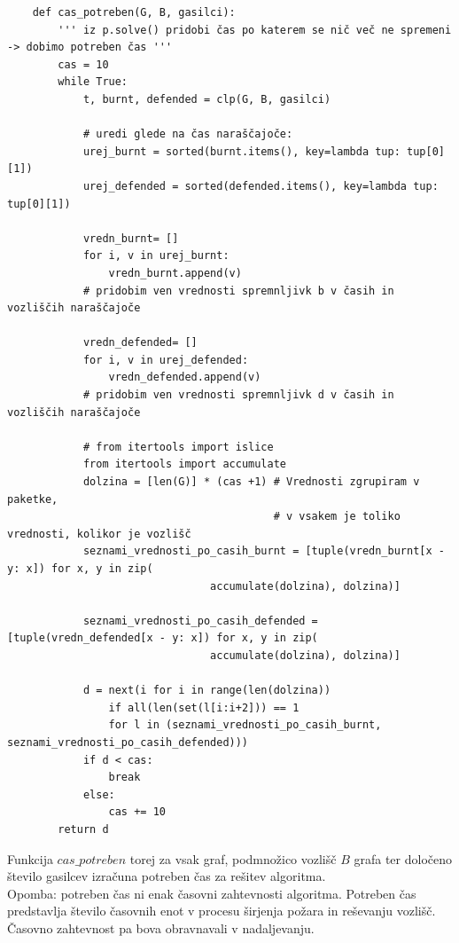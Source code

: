 \documentclass[a4paper, 12pt]{article}
\begin{document}
\begin{scriptsize}
\begin{verbatim}
    def cas_potreben(G, B, gasilci):
        ''' iz p.solve() pridobi čas po katerem se nič več ne spremeni -> dobimo potreben čas '''
        cas = 10
        while True:
            t, burnt, defended = clp(G, B, gasilci)

            # uredi glede na čas naraščajoče:
            urej_burnt = sorted(burnt.items(), key=lambda tup: tup[0][1])
            urej_defended = sorted(defended.items(), key=lambda tup: tup[0][1]) 

            vredn_burnt= []
            for i, v in urej_burnt:
                vredn_burnt.append(v)
            # pridobim ven vrednosti spremnljivk b v časih in vozliščih naraščajoče

            vredn_defended= []
            for i, v in urej_defended:
                vredn_defended.append(v)
            # pridobim ven vrednosti spremnljivk d v časih in vozliščih naraščajoče

            # from itertools import islice
            from itertools import accumulate
            dolzina = [len(G)] * (cas +1) # Vrednosti zgrupiram v paketke, 
                                          # v vsakem je toliko vrednosti, kolikor je vozlišč
            seznami_vrednosti_po_casih_burnt = [tuple(vredn_burnt[x - y: x]) for x, y in zip(
                                accumulate(dolzina), dolzina)]

            seznami_vrednosti_po_casih_defended = [tuple(vredn_defended[x - y: x]) for x, y in zip(
                                accumulate(dolzina), dolzina)]

            d = next(i for i in range(len(dolzina)) 
                if all(len(set(l[i:i+2])) == 1 
                for l in (seznami_vrednosti_po_casih_burnt, seznami_vrednosti_po_casih_defended)))
            if d < cas:
                break
            else:
                cas += 10
        return d\end{verbatim}
\end{scriptsize}

\noindent Funkcija $cas\_potreben$ torej za vsak graf, podmnožico vozlišč $B$ grafa ter določeno število gasilcev
izračuna potreben čas za rešitev algoritma. \\
Opomba: potreben čas ni enak časovni zahtevnosti
algoritma. Potreben čas predstavlja število časovnih enot v procesu širjenja požara in reševanju vozlišč.
Časovno zahtevnost pa bova obravnavali v nadaljevanju. 
\end{document}
